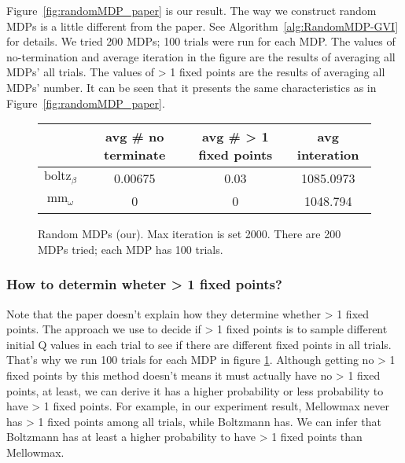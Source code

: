 Figure\ \ref{fig:randomMDP_paper} is our result.
The way we construct random MDPs is a little different from the paper. 
See Algorithm\ \ref{alg:RandomMDP-GVI} for details. We tried 200 MDPs; 100 trials were run for each MDP. 
The values of no-termination and average iteration in the figure are the results of averaging all MDPs' all trials.
The values of > 1 fixed points are the results of averaging all MDPs' number.
It can be seen that it presents the same characteristics as in Figure\ \ref{fig:randomMDP_paper}.

\begin{figure}[H]
    \centering
    \begin{tabular}{ |c|c|c|c| } 
     \hline
     { }  & avg \# no terminate & avg \# > 1 fixed points & avg interation\\ 
     \hline
     $\text{boltz}_\beta$ & 0.00675 & 0.03 & 1085.0973\\ 
     \hline
     $\text{mm}_\omega$ & 0 & 0 & 1048.794 \\ 
     \hline
    \end{tabular}
    \caption{Random MDPs (our). Max iteration is set 2000. There are 200 MDPs tried; each MDP has 100 trials.}\label{fig:randomMDP_our}
\end{figure}


\subsubsection{How to determin wheter > 1 fixed points?}
{Note that the paper doesn't explain how they determine whether > 1 fixed points. 
The approach we use to decide if > 1 fixed points is to sample different initial Q values 
in each trial to see if there are different fixed points in all trials. 
That's why we run 100 trials for each MDP in figure \ref{fig:randomMDP_our}. 
Although getting no > 1 fixed points by this method doesn't means it must actually have no > 1 fixed points, 
at least, we can derive it has a higher probability or less probability to have > 1 fixed points. 
For example, in our experiment result, Mellowmax never has > 1 fixed points among all trials, 
while Boltzmann has. We can infer that Boltzmann has at least a higher probability to have > 1 fixed points than Mellowmax.
}\label{randomMDP_finding_fixed_points_issue}



